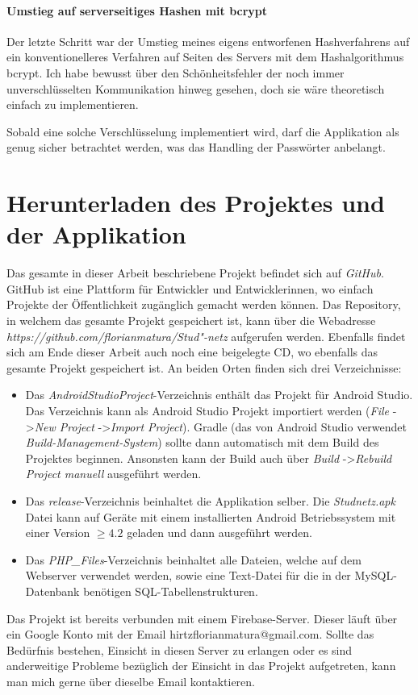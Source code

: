 \documentclass[../main.tex]{subfiles}
\begin{document}
	\paragraph{Umstieg auf serverseitiges Hashen mit bcrypt}
	Der letzte Schritt war der Umstieg meines eigens entworfenen Hashverfahrens auf ein konventionelleres Verfahren auf Seiten des Servers mit dem Hashalgorithmus bcrypt. Ich habe bewusst über den Schönheitsfehler der noch immer unverschlüsselten Kommunikation hinweg gesehen, doch sie wäre theoretisch einfach zu implementieren. 
	
	Sobald eine solche Verschlüsselung implementiert wird, darf die Applikation als genug sicher betrachtet werden, was das Handling der Passwörter anbelangt.
	
	\section{Herunterladen des Projektes und der Applikation} \label{github}

	Das gesamte in dieser Arbeit beschriebene Projekt befindet sich auf \emph{GitHub}. GitHub ist eine Plattform für Entwickler und Entwicklerinnen, wo einfach Projekte der Öffentlichkeit zugänglich gemacht werden können. Das Repository, in welchem das gesamte Projekt gespeichert ist, kann über die Webadresse \emph{https://github.com/florianmatura/Stud"-netz} aufgerufen werden. Ebenfalls findet sich am Ende dieser Arbeit auch noch eine beigelegte CD, wo ebenfalls das gesamte Projekt gespeichert ist. An beiden Orten finden sich drei Verzeichnisse:

	\begin{itemize}
		\item Das \emph{AndroidStudioProject}-Verzeichnis enthält das Projekt für Android Studio. Das Verzeichnis kann als Android Studio Projekt importiert werden (\emph{File} -\textgreater \emph{New Project} -\textgreater \emph{Import Project}). Gradle (das von Android Studio verwendet \emph{Build-Management-System}) sollte dann automatisch mit dem Build des Projektes beginnen. Ansonsten kann der Build auch über \emph{Build} -\textgreater \emph{Rebuild Project manuell} ausgeführt werden.
		\item Das \emph{release}-Verzeichnis beinhaltet die Applikation selber. Die \emph{Studnetz.apk} Datei kann auf Geräte mit einem installierten Android Betriebssystem mit einer Version $\ge4.2$ geladen und dann ausgeführt werden.
		\item Das \emph{PHP\_Files}-Verzeichnis beinhaltet alle Dateien, welche auf dem Webserver verwendet werden, sowie eine Text-Datei für die in der MySQL-Datenbank benötigen SQL-Tabellenstrukturen.
	\end{itemize}
	
	Das Projekt ist bereits verbunden mit einem Firebase-Server. Dieser läuft über ein Google Konto mit der Email hirtzflorianmatura@gmail.com. Sollte das Bedürfnis bestehen, Einsicht in diesen Server zu erlangen oder es sind anderweitige Probleme bezüglich der Einsicht in das Projekt aufgetreten, kann man mich gerne über dieselbe Email kontaktieren.
	
\end{document}

